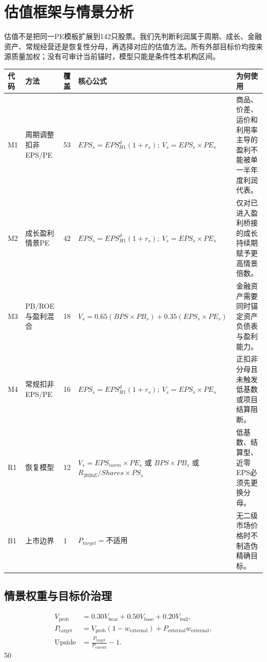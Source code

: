 \chapter{估值框架与情景分析}

估值不是把同一PE模板扩展到142只股票。我们先判断利润属于周期、成长、金融资产、常规经营还是恢复性分母，再选择对应的估值方法。所有外部目标价均按来源质量加权；没有可审计当前锚时，模型只能是条件性本机构区间。

\noindent
\begin{exhibitbox}[图表 5｜估值方法选择矩阵]
\small
\begin{tabularx}{\textwidth}{L{1.0cm}L{2.2cm}R{1.0cm}X L{4.0cm}}
\toprule
\textbf{代码} & \textbf{方法} & \textbf{覆盖} & \textbf{核心公式} & \textbf{为何使用} \\
\midrule
M1 & 周期调整扣非EPS/PE & 53 & \(EPS_s=EPS_{H1}^d(1+r_s);\ V_s=EPS_s\times PE_s\) & 商品、价差、运价和利用率主导的盈利不能被单一半年度利润代表。 \\
M2 & 成长盈利情景PE & 42 & \(EPS_s=EPS_{H1}^d(1+r_s);\ V_s=EPS_s\times PE_s\) & 仅对已进入盈利桥接的成长持续期赋予更高情景倍数。 \\
M3 & PB/ROE与盈利混合 & 18 & \(V_s=0.65(BPS\times PB_s)+0.35(EPS_s\times PE_s)\) & 金融资产需要同时锚定资产负债表与盈利能力。 \\
M4 & 常规扣非EPS/PE & 16 & \(EPS_s=EPS_{H1}^d(1+r_s);\ V_s=EPS_s\times PE_s\) & 正扣非分母且未触发低基数或项目结算阻断。 \\
R1 & 恢复模型 & 12 & \(V_s=EPS_{norm}\times PE_s\) 或 \(BPS\times PB_s\) 或 \(R_{2026E}/Shares\times PS_s\) & 低基数、结算型、近零EPS必须先更换分母。 \\
B1 & 上市边界 & 1 & \(P_{target}=\text{不适用}\) & 无二级市场价格时不制造伪精确目标。 \\
\bottomrule
\end{tabularx}
\normalsize
{}
\end{exhibitbox}

\section{情景权重与目标价治理}

\begin{align*}
V_{\mathrm{prob}} &= 0.30V_{\mathrm{bear}}+0.50V_{\mathrm{base}}+0.20V_{\mathrm{bull}}, \\
P_{\mathrm{target}} &= V_{\mathrm{prob}}(1-w_{\mathrm{external}})+P_{\mathrm{external}}w_{\mathrm{external}}, \\
\mathrm{Upside} &= \frac{P_{\mathrm{target}}}{P_{\mathrm{current}}}-1.
\end{align*}
50%

